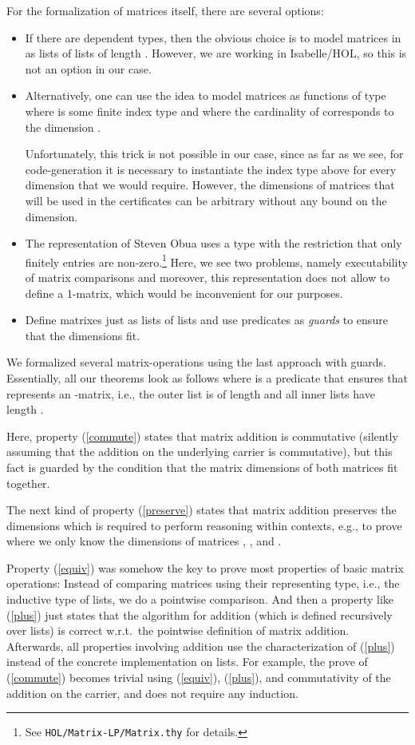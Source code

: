 \documentclass[a4paper]{llncs}
\newcommand{\rSub}[1]{(\ref{#1})}
\begin{document}
For the formalization of matrices itself, there are several options:
\begin{itemize}
\item If there are dependent types, then the obvious choice is
  to model matrices in  as lists of lists of length . However,
  we are working in Isabelle/HOL, so this is not an option in our case.
\item Alternatively, one can use the idea 
  to model matrices as functions of type  where
   is some finite index type and where the cardinality of  
  corresponds to the
  dimension \cite{Harrison05}.
  
  Unfortunately, this trick is not possible in our case, since as far as we
  see, for code-generation it is necessary to instantiate the index type 
  above for every dimension that we would require. However,
  the dimensions of matrices that will be used in the certificates can
  be arbitrary without any bound on the dimension.
\item The representation of Steven Obua uses a type 
  with the restriction that only finitely entries are non-zero.\footnote{See
  \texttt{HOL/Matrix-LP/Matrix.thy} for details.}
  Here, we see two problems, namely executability of matrix comparisons
  and moreover, this representation does not allow to define a 1-matrix,
  which would be inconvenient for our purposes.
\item Define matrixes just as lists of lists and use predicates as \emph{guards}
  to
  ensure that the dimensions fit.
\end{itemize}

\newcommand{\gm}[3]{\mathsf{mat}^{#1,#2}(#3)}

We formalized several matrix-operations using the last approach with guards. 
Essentially, all our theorems look as follows where  is a predicate
that ensures that  represents an -matrix, i.e., the outer list
is of length  and all inner lists have length .


Here, property \rSub{commute} states that matrix addition is commutative
(silently assuming that the addition on the underlying carrier is commutative),
but this fact is guarded by the condition that the matrix dimensions of both matrices fit together.

The next kind of property \rSub{preserve} states that matrix addition preserves
the dimensions which is required to perform reasoning within contexts, e.g.,
to prove  where we only know the dimensions of
matrices , , and .

Property \rSub{equiv} was somehow the key to prove most properties of basic matrix
operations: Instead of comparing matrices using their representing type, i.e., the
inductive type of lists, we do a pointwise comparison. And then a property
like \rSub{plus} 
just states that the algorithm for addition (which is defined recursively over lists) is correct 
w.r.t.\ the pointwise definition of matrix addition. Afterwards, all properties
involving addition use the characterization of \rSub{plus} instead of the concrete implementation on lists.
For example, the prove of \rSub{commute} becomes trivial using \rSub{equiv},
\rSub{plus}, and commutativity of the addition on the carrier, and does not
require any induction.
\end{document}
